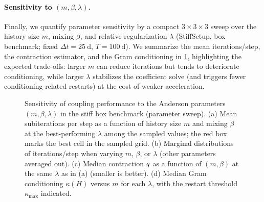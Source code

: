 \paragraph{Sensitivity to $(m,\beta,\lambda)$.}
Finally, we quantify parameter sensitivity by a compact $3\times 3\times 3$ sweep over the history size $m$, mixing $\beta$, and relative regularization $\lambda$ (StiffSetup, box benchmark; fixed $\Delta t=25~\mathrm{d}$, $T=100~\mathrm{d}$).
We summarize the mean iterations/step, the contraction estimator, and the Gram conditioning in \cref{fig:anderson_sweep}, highlighting the expected trade-offs: larger $m$ can reduce iterations but tends to deteriorate conditioning, while larger $\lambda$ stabilizes the coefficient solve (and triggers fewer conditioning-related restarts) at the cost of weaker acceleration.

\begin{figure}[htbp]
  \centering
  \caption{Sensitivity of coupling performance to the Anderson parameters $(m,\beta,\lambda)$ in the stiff box benchmark (parameter sweep).
  (a) Mean subiterations per step as a function of history size $m$ and mixing $\beta$ at the best-performing $\lambda$ among the sampled values; the red box marks the best cell in the sampled grid.
  (b) Marginal distributions of iterations/step when varying $m$, $\beta$, or $\lambda$ (other parameters averaged out).
  (c) Median contraction $q$ as a function of $(m,\beta)$ at the same $\lambda$ as in (a) (smaller is better).
  (d) Median Gram conditioning $\kappa(H)$ versus $m$ for each $\lambda$, with the restart threshold $\kappa_{\max}$ indicated.}
  \label{fig:anderson_sweep}
\end{figure}
